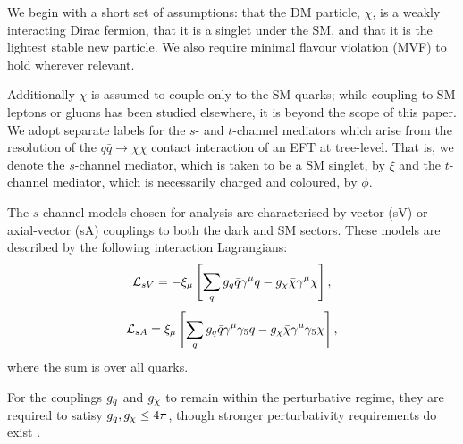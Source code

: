We begin with a short set of assumptions: that the DM particle, $\chi$, is a weakly interacting Dirac fermion, that it is a singlet under the SM, and that it is the lightest stable new particle. We also require minimal flavour violation (MVF) to hold wherever relevant.

Additionally $\chi$ is assumed to couple only to the SM quarks; while coupling to SM leptons \cite{} or gluons \cite{} has been studied elsewhere, it is beyond the scope of this paper. We adopt separate labels for the $s$- and $t$-channel mediators which arise from the resolution of the $q\bar q \rightarrow \chi \chi$ contact interaction of an EFT at tree-level. That is, we denote the $s$-channel mediator, which is taken to be a SM singlet, by $\xi$ and the $t$-channel mediator, which is necessarily charged and coloured, by $\phi$.

The $s$-channel models chosen for analysis are characterised by vector (sV) or axial-vector (sA) couplings to both the dark and SM sectors. 
These models are described by the following interaction Lagrangians:
\begin{equation}
\label{L_int_sV}
\mathcal{L}_{sV} = - \xi_{\mu}\left[ \sum\limits_{q} g_q\bar{q}\gamma^{\mu}q - g_{\chi}\bar{\chi}\gamma^{\mu}\chi\right],
\end{equation}
\begin{equation}
\label{L_int_sA}
\mathcal{L}_{sA} =  \xi_{\mu}\left[\sum\limits_{q} g_q\bar{q}\gamma^{\mu}\gamma_{5}q - g_{\chi}\bar{\chi}\gamma^{\mu}\gamma_{5}\chi\right],
\end{equation}
where the sum is over all quarks.

For the couplings $g_q$ and $g_{\chi}$ to remain within the perturbative regime, they are required to satisy $g_q,g_{\chi} \leq 4\pi$, though stronger perturbativity requirements do exist \cite{ValidEFT}.

